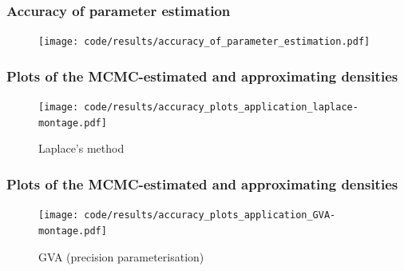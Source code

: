 \documentclass{beamer}
\begin{document}
	
	\begin{frame}
		\frametitle{Accuracy of parameter estimation}
		\begin{figure}
			\texttt{[image: code/results/accuracy\_of\_parameter\_estimation.pdf]}
		\end{figure}
	\end{frame}
			
	\begin{frame}
		\frametitle{Plots of the MCMC-estimated and approximating densities}
		\begin{figure}
			\caption{Laplace's method}
			\texttt{[image: code/results/accuracy\_plots\_application\_laplace-montage.pdf]}
		\end{figure}
	\end{frame}
			
	\begin{frame}
		\frametitle{Plots of the MCMC-estimated and approximating densities}
		\begin{figure}
			\caption{GVA (precision parameterisation)}
			\texttt{[image: code/results/accuracy\_plots\_application\_GVA-montage.pdf]}
		\end{figure}
	\end{frame}
			
			
\end{document}
